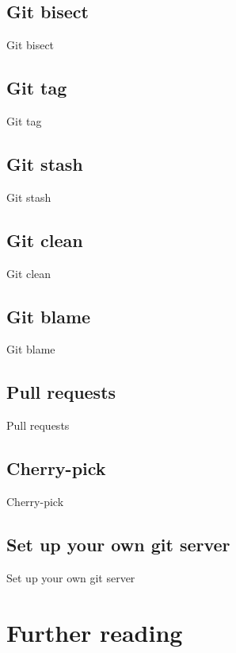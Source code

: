 \documentclass[10pt,a4paper]{beamer}
\begin{document}
\subsection{Git bisect}
\begin{frame}{Git bisect}

\end{frame}

\subsection{Git tag}
\begin{frame}{Git tag}

\end{frame}

\subsection{Git stash}
\begin{frame}{Git stash}

\end{frame}

\subsection{Git clean}
\begin{frame}{Git clean}

\end{frame}

\subsection{Git blame}
\begin{frame}{Git blame}

\end{frame}

\subsection{Pull requests}
\begin{frame}{Pull requests}

\end{frame}

\subsection{Cherry-pick}
\begin{frame}{Cherry-pick}

\end{frame}

\subsection{Set up your own git server}
\begin{frame}{Set up your own git server}

\end{frame}

\section{Further reading}
\begin{frame}

\end{frame}
\end{document}
